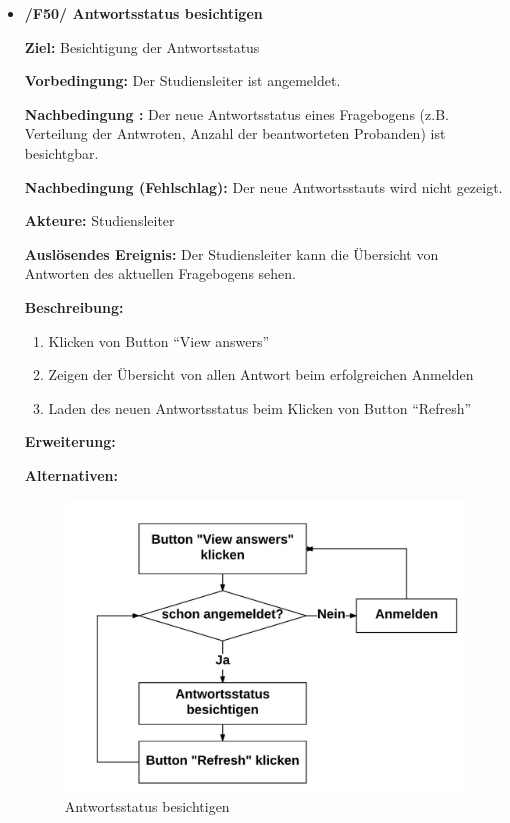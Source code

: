 \documentclass[a4paper]{scrreprt}
\begin{document}
\begin{itemize}
                \item \textbf{/F50/ \gls{Antwortsstatus} besichtigen}
                \par \textbf{Ziel: }Besichtigung der Antwortsstatus
                \par \textbf{Vorbedingung: }Der \gls{Studiensleiter} ist angemeldet.
                \par \textbf{Nachbedingung : }Der neue Antwortsstatus eines Fragebogens (z.B. Verteilung der Antwroten, Anzahl der beantworteten \gls{Proband}en) ist besichtgbar.
                \par \textbf{Nachbedingung (Fehlschlag): }Der neue Antwortsstauts wird nicht gezeigt.
                \par \textbf{Akteure: }\gls{Studiensleiter}
                \par \textbf{Auslösendes Ereignis: }Der \gls{Studiensleiter} kann die \"Ubersicht von Antworten des aktuellen Fragebogens sehen.
                \par \textbf{Beschreibung: }
                \begin{enumerate}
                    \item Klicken von Button ``View answers''
                    \item Zeigen der \"Ubersicht von allen Antwort beim erfolgreichen Anmelden
                    \item Laden des neuen Antwortsstatus beim Klicken von Button ``Refresh''
                \end{enumerate}
                \par \textbf{Erweiterung: }
                \par \textbf{Alternativen: }
                \begin{figure}[H]
                    \centering
                    \includegraphics[scale=0.9]{Antwortsstatus_besichtigen.jpeg}
                    \caption{Antwortsstatus besichtigen}
                \end{figure}



\end{itemize}
\end{document}
